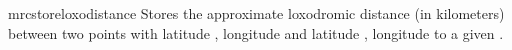 \enlargethispage*{1cm}

\begin{docCommand}{mrcstoreloxodistance}{}
  Stores the approximate loxodromic distance (in kilometers) between two points
  with latitude , longitude 
  and latitude , longitude 
  to a given .
  \begin{dispExample}
  \mrcstoreloxodistance{}
  \mydist
  \end{dispExample}
\end{docCommand}

